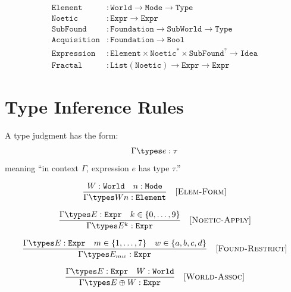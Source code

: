 \begin{definition}
\label{def:compound-types}
\begin{align}
\mathtt{Element} &: \mathtt{World} \to \mathtt{Mode} \to \mathtt{Type} \\
\mathtt{Noetic} &: \mathtt{Expr} \to \mathtt{Expr} \\
\mathtt{SubFound} &: \mathtt{Foundation} \to \mathtt{SubWorld} \to \mathtt{Type} \\
\mathtt{Acquisition} &: \mathtt{Foundation} \to \mathtt{Bool} \\
\mathtt{Expression} &: \mathtt{Element} \times \mathtt{Noetic}^* \times \mathtt{SubFound}^? \to \mathtt{Idea} \\
\mathtt{Fractal} &: \mathtt{List}(\mathtt{Noetic}) \to \mathtt{Expr} \to \mathtt{Expr}
\end{align}
\end{definition}

\section{Type Inference Rules}

\begin{definition}
\label{def:type-judgment}
A type judgment has the form:
\[
\Gamma \types e : \tau
\]
meaning ``in context $\Gamma$, expression $e$ has type $\tau$.''
\end{definition}

\begin{definition}
\label{def:elem-form}
\[
\frac{W : \mathtt{World} \quad n : \mathtt{Mode}}{\Gamma \types Wn : \mathtt{Element}} \quad [\textsc{Elem-Form}]
\]
\end{definition}

\begin{definition}
\label{def:noetic-rule}
\[
\frac{\Gamma \types E : \mathtt{Expr} \quad k \in \{0,\ldots,9\}}{\Gamma \types E^k : \mathtt{Expr}} \quad [\textsc{Noetic-Apply}]
\]
\end{definition}

\begin{definition}
\label{def:found-rule}
\[
\frac{\Gamma \types E : \mathtt{Expr} \quad m \in \{1,\ldots,7\} \quad w \in \{a,b,c,d\}}{\Gamma \types E_{mw} : \mathtt{Expr}} \quad [\textsc{Found-Restrict}]
\]
\end{definition}

\begin{definition}
\label{def:world-rule}
\[
\frac{\Gamma \types E : \mathtt{Expr} \quad W : \mathtt{World}}{\Gamma \types E \oplus W : \mathtt{Expr}} \quad [\textsc{World-Assoc}]
\]
\end{definition}

